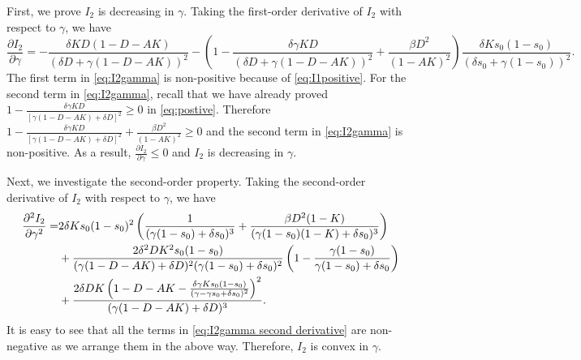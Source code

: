 \documentclass[nonblindrev, copyedit]{informs3a}
\newcounter{prop}[chapter]
\begin{document}
First, we prove $I_2$ is decreasing in $\gamma$. Taking the first-order derivative of $I_2$ with respect to $\gamma$, we have
\begin{equation}\label{eq:I2gamma}
\frac{\partial I_2}{\partial \gamma}
=-\frac{\delta KD(1-D-AK)}{(\delta D+\gamma(1-D-AK))^2}-\left(1-\frac{\delta\gamma KD}{(\delta D+\gamma(1-D-AK))^2}+\frac{\beta D^2}{(1-AK)^2}\right)\frac{\delta Ks_0(1-s_0)}{(\delta s_0+\gamma(1-s_0))^2}.
\end{equation}
The first term in \eqref{eq:I2gamma} is non-positive because of \eqref{eq:I1positive}.
For the second term in \eqref{eq:I2gamma}, recall that we have already proved $1-\frac{\delta\gamma KD}{[\gamma(1-D-AK)+\delta D]^2}\ge 0$
in \eqref{eq:postive}. Therefore $1-\frac{\delta\gamma KD}{[\gamma(1-D-AK)+\delta D]^2}+\frac{\beta D^2}{(1-AK)^2}\ge 0$ and the second term in \eqref{eq:I2gamma} is non-positive.
As a result, $\frac{\partial I_2}{\partial \gamma}\le 0$ and $I_2$ is decreasing in $\gamma$.

Next, we investigate the second-order property. Taking the second-order derivative of $I_2$ with respect to $\gamma$, we have
\begin{align}
 \frac{\partial^2 I_2}{\partial \gamma^2}
=&2\delta K s_0(1-s_0)^2\left(\frac{1}{(\gamma(1-s_0)+\delta s_0)^3}+\frac{\beta D^2(1-K)}{(\gamma(1-s_0)(1-K)+\delta s_0)^3}\right)\notag\\
&+\frac{2\delta^2 DK^2s_0(1-s_0)}{(\gamma(1-D-AK)+\delta D)^2(\gamma(1-s_0)+\delta s_0)^2}\left(1-\frac{\gamma(1-s_0)}{\gamma(1-s_0)+\delta s_0}\right)\notag\\
&+\frac{2\delta DK\left(1-D-AK-\frac{\delta\gamma Ks_0(1-s_0)}{(\gamma-\gamma s_0+\delta s_0)^2}\right)^2}{(\gamma(1-D-AK)+\delta D)^3}.\label{eq:I2gamma second derivative}
\end{align}
It is easy to see that all the terms in \eqref{eq:I2gamma second derivative} are non-negative as we arrange them in the above way.
Therefore, $I_2$ is convex in $\gamma$.
\end{document}
